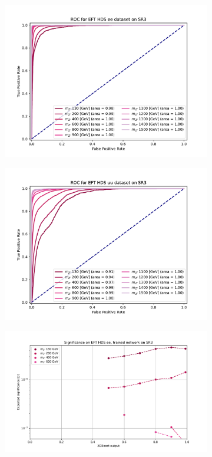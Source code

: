 \documentclass[12pt, a4paper]{book}
\begin{document}
\begin{figure}[!ht]
\begin{subfigure}[b]{0.49\textwidth}
      \includegraphics[width=1\textwidth]{XGBoost/Model_independent/150/EFT_HDS/ROC_ee.pdf}
   \end{subfigure}
   \hfill
   \begin{subfigure}[b]{0.49\textwidth}
      \centering
      \includegraphics[width=1\textwidth]{XGBoost/Model_independent/150/EFT_HDS/ROC_uu.pdf}
   \end{subfigure}
   \hfill
	\begin{subfigure}[b]{0.49\textwidth}
      \centering
      \includegraphics[width=1\textwidth]{XGBoost/Model_independent/150/EFT_HDS/EXP_SIG_ee.pdf}

\end{subfigure}
\end{figure}
\end{document}
